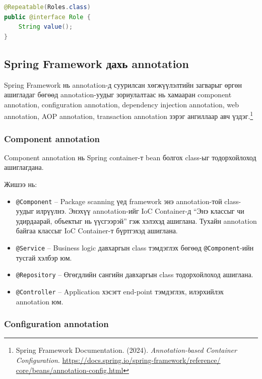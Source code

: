 \begin{lstlisting}[language=Java, caption={\texttt{@Repeatable} ашигласан жишээ}, label={lst:repeatable-example}]
@Repeatable(Roles.class)
public @interface Role {
    String value();
}
\end{lstlisting}

\newpage

\subsection{Spring Framework дахь annotation}

Spring Framework нь annotation-д суурилсан хөгжүүлэлтийн загварыг өргөн ашигладаг бөгөөд annotation-уудыг зориулалтаас нь хамааран component annotation, configuration annotation, dependency injection annotation, web annotation, AOP annotation, transaction annotation зэрэг ангиллаар авч үздэг.\footnote{Spring Framework Documentation. (2024).
\textit{Annotation-based Container Configuration}.
\url{https://docs.spring.io/spring-framework/reference/
core/beans/annotation-config.html}}

\subsubsection{Component annotation}

Component annotation нь Spring container-т bean болгох class-ыг тодорхойлоход ашиглагдана.

Жишээ нь:
\begin{itemize}
    \item \texttt{@Component} -- Package scanning үед framework энэ annotation-той class-уудыг илрүүлнэ. Энэхүү annotation-ийг IoC Container-д ``Энэ классыг чи удирдаарай, объектыг нь үүсгээрэй'' гэж хэлэхэд ашиглана. Тухайн annotation байгаа классыг IoC Container-т бүртгэхэд ашиглана.
    \item \texttt{@Service} -- Business logic давхаргын class тэмдэглэх бөгөөд \texttt{@Component}-ийн тусгай хэлбэр юм.
    \item \texttt{@Repository} -- Өгөгдлийн сангийн давхаргын class тодорхойлоход ашиглана.
    \item \texttt{@Controller} -- Application хэсэгт end-point тэмдэглэх, илэрхийлэх annotation юм.
\end{itemize}

\newpage
\subsubsection{Configuration annotation}

